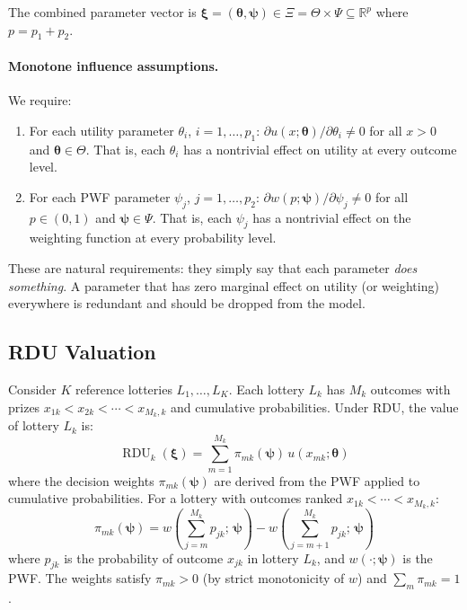 \documentclass[11pt,a4paper]{article}
\theoremstyle{definition}
\newcommand{\R}{\mathbb{R}}
\newcommand{\btheta}{\boldsymbol{\theta}}
\newcommand{\bxi}{\boldsymbol{\xi}}
\newcommand{\bpsi}{\boldsymbol{\psi}}
\DeclareMathOperator{\RDU}{RDU}
\begin{document}
The combined parameter vector is $\bxi = (\btheta, \bpsi) \in
\Xi = \Theta \times \Psi \subseteq \R^p$ where $p = p_1 + p_2$.

\paragraph{Monotone influence assumptions.}
We require:
\begin{enumerate}
    \item For each utility parameter $\theta_i$, $i = 1, \ldots, p_1$:
    $\partial u(x; \btheta) / \partial \theta_i \neq 0$ for all
    $x > 0$ and $\btheta \in \Theta$. That is, each $\theta_i$ has a
    nontrivial effect on utility at every outcome level.

    \item For each PWF parameter $\psi_j$, $j = 1, \ldots, p_2$:
    $\partial w(p; \bpsi) / \partial \psi_j \neq 0$ for all
    $p \in (0,1)$ and $\bpsi \in \Psi$. That is, each $\psi_j$ has a
    nontrivial effect on the weighting function at every probability level.
\end{enumerate}

These are natural requirements: they simply say that each parameter
\emph{does something}. A parameter that has zero marginal effect on utility (or
weighting) everywhere is redundant and should be dropped from the model.

\subsection{RDU Valuation}

Consider $K$ reference lotteries $L_1, \ldots, L_K$. Each lottery $L_k$ has
$M_k$ outcomes with prizes $x_{1k} < x_{2k} < \cdots < x_{M_k,k}$ and
cumulative probabilities. Under RDU, the value of lottery $L_k$ is:
\begin{equation}
    \label{eq:rdu}
    \RDU_k(\bxi) = \sum_{m=1}^{M_k} \pi_{mk}(\bpsi) \, u(x_{mk}; \btheta)
\end{equation}
where the decision weights $\pi_{mk}(\bpsi)$ are derived from the PWF applied
to cumulative probabilities. For a lottery with outcomes ranked
$x_{1k} < \cdots < x_{M_k,k}$:
\begin{equation}
    \pi_{mk}(\bpsi) = w\!\left(\sum_{j=m}^{M_k} p_{jk};\, \bpsi\right)
    - w\!\left(\sum_{j=m+1}^{M_k} p_{jk};\, \bpsi\right)
\end{equation}
where $p_{jk}$ is the probability of outcome $x_{jk}$ in lottery $L_k$, and
$w(\cdot;\bpsi)$ is the PWF. The weights satisfy $\pi_{mk} > 0$ (by strict
monotonicity of $w$) and $\sum_m \pi_{mk} = 1$.
\end{document}
